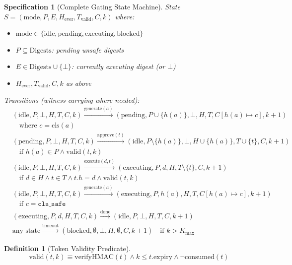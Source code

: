 \documentclass[12pt]{article}
\newtheorem{definition}{Definition}[section]
\newtheorem{spec}{Specification}[section]
\begin{document}
\begin{spec}[Complete Gating State Machine]
State $S = (\text{mode}, P, E, H_{\text{ever}}, T_{\text{valid}}, C, k)$ where:
\begin{itemize}
    \item $\text{mode} \in \{\text{idle}, \text{pending}, \text{executing}, \text{blocked}\}$
    \item $P \subseteq \mathrm{Digests}$: pending unsafe digests
    \item $E \in \mathrm{Digests} \cup \{\bot\}$: currently executing digest (or $\bot$)
    \item $H_{\text{ever}}, T_{\text{valid}}, C, k$ as above
\end{itemize}

Transitions (witness-carrying where needed):
\begin{align*}
& (\text{idle}, P, \bot, H, T, C, k) \xrightarrow{\text{generate}(a)} (\text{pending}, P\cup\{h(a)\}, \bot, H, T, C[h(a)\mapsto c], k+1) \\
& \quad \text{where } c = \mathrm{cls}(a) \\
& (\text{pending}, P, \bot, H, T, C, k) \xrightarrow{\text{approve}(t)} (\text{idle}, P\setminus\{h(a)\}, \bot, H\cup\{h(a)\}, T\cup\{t\}, C, k+1) \\
& \quad \text{if } h(a) \in P \land \text{valid}(t,k) \\
& (\text{idle}, P, \bot, H, T, C, k) \xrightarrow{\text{execute}(d,t)} (\text{executing}, P, d, H, T\setminus\{t\}, C, k+1) \\
& \quad \text{if } d \in H \land t \in T \land t.h = d \land \text{valid}(t,k) \\
& (\text{idle}, P, \bot, H, T, C, k) \xrightarrow{\text{generate}(a)} (\text{executing}, P, h(a), H, T, C[h(a)\mapsto c], k+1) \\
& \quad \text{if } c = \texttt{cls\_safe} \\
& (\text{executing}, P, d, H, T, C, k) \xrightarrow{\text{done}} (\text{idle}, P, \bot, H, T, C, k+1) \\
& \text{any state} \xrightarrow{\text{timeout}} (\text{blocked}, \emptyset, \bot, H, \emptyset, C, k+1) \quad \text{if } k > K_{\max}
\end{align*}
\end{spec}

\begin{definition}[Token Validity Predicate]
\[
\text{valid}(t,k) \equiv \text{verifyHMAC}(t) \land k \leq t.\text{expiry} \land \neg\text{consumed}(t)
\]
\end{definition}
\end{document}
